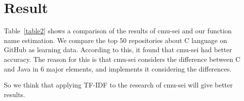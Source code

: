 \documentclass[JIP]{apris}
\begin{document}


\section{Result}
Table~\ref{table2} shows a comparison of the results of cmu-sei and our function name estimation.  
We compare the top 50 repositories about C language on GitHub as learning data. According to this, it found that cmu-sei had better accuracy. 
The reason for this is that cmu-sei considers the difference between C and Java in 6 major elements, and implements it considering the differences.

So we think that applying TF-IDF to the research of cmu-sei will give better results.


\end{document}
